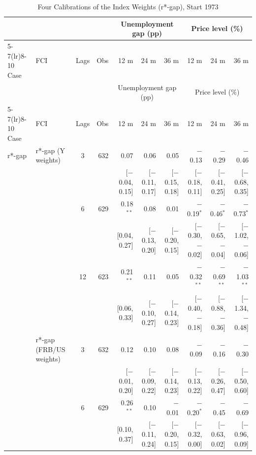 \begingroup\scriptsize\setlength{\tabcolsep}{0.9pt}
\begin{longtable}{llcrrrrrrr}
\caption{Four Calibrations of the Index Weights (r*-gap), Start 1973}\label{tab:appR673}\\
\toprule
 & & & & \multicolumn{3}{c}{Unemployment gap (pp)} & \multicolumn{3}{c}{Price level (\%)}\\ \cmidrule(lr){5-7}\cmidrule(lr){8-10}
Case & FCI & Lags & Obs & 12 m & 24 m & 36 m & 12 m & 24 m & 36 m\\
\midrule\endfirsthead
\toprule
 & & & & \multicolumn{3}{c}{Unemployment gap (pp)} & \multicolumn{3}{c}{Price level (\%)}\\ \cmidrule(lr){5-7}\cmidrule(lr){8-10}
Case & FCI & Lags & Obs & 12 m & 24 m & 36 m & 12 m & 24 m & 36 m\\
\midrule\endhead
\bottomrule\endfoot
r*-gap & r*-gap (Y weights) & 3 & 632 & 0.07 & 0.06 & 0.05 & $-$0.13 & $-$0.29 & $-$0.46\\
 & & & & {\scriptsize [$-$0.04, 0.15]} & {\scriptsize [$-$0.11, 0.17]} & {\scriptsize [$-$0.15, 0.18]} & {\scriptsize [$-$0.18, 0.11]} & {\scriptsize [$-$0.41, 0.25]} & {\scriptsize [$-$0.68, 0.35]}\\
 &  & 6 & 629 & 0.18$^{**}$ & 0.08 & 0.01 & $-$0.19$^{*}$ & $-$0.46$^{*}$ & $-$0.73$^{*}$\\
 & & & & {\scriptsize [0.04, 0.27]} & {\scriptsize [$-$0.13, 0.20]} & {\scriptsize [$-$0.20, 0.15]} & {\scriptsize [$-$0.30, $-$0.02]} & {\scriptsize [$-$0.65, $-$0.04]} & {\scriptsize [$-$1.02, $-$0.06]}\\
 &  & 12 & 623 & 0.21$^{**}$ & 0.11 & 0.05 & $-$0.32$^{**}$ & $-$0.69$^{**}$ & $-$1.03$^{**}$\\
 & & & & {\scriptsize [0.06, 0.33]} & {\scriptsize [$-$0.10, 0.27]} & {\scriptsize [$-$0.14, 0.23]} & {\scriptsize [$-$0.40, $-$0.18]} & {\scriptsize [$-$0.88, $-$0.36]} & {\scriptsize [$-$1.34, $-$0.48]}\\
 & r*-gap (FRB/US weights) & 3 & 632 & 0.12 & 0.10 & 0.08 & $-$0.09 & $-$0.16 & $-$0.30\\
 & & & & {\scriptsize [$-$0.01, 0.20]} & {\scriptsize [$-$0.09, 0.22]} & {\scriptsize [$-$0.14, 0.23]} & {\scriptsize [$-$0.13, 0.22]} & {\scriptsize [$-$0.26, 0.47]} & {\scriptsize [$-$0.50, 0.60]}\\
 &  & 6 & 629 & 0.26$^{**}$ & 0.10 & $-$0.01 & $-$0.20$^{*}$ & $-$0.45 & $-$0.69\\
 & & & & {\scriptsize [0.10, 0.37]} & {\scriptsize [$-$0.11, 0.24]} & {\scriptsize [$-$0.20, 0.15]} & {\scriptsize [$-$0.32, 0.00]} & {\scriptsize [$-$0.63, 0.02]} & {\scriptsize [$-$0.96, 0.09]}\\

\end{longtable}
